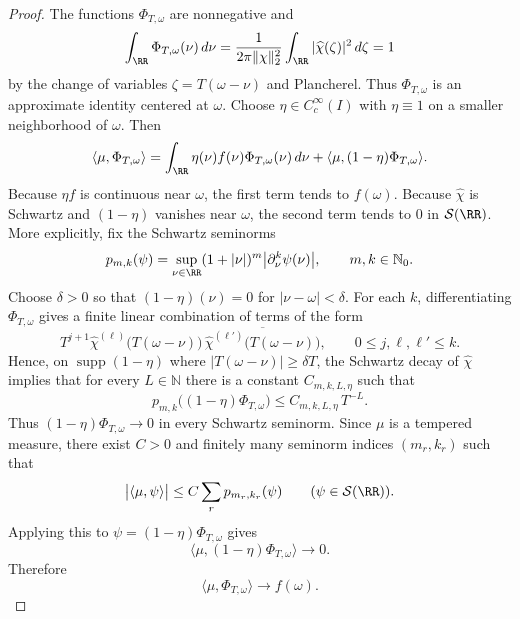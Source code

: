 \begin{proof}
The functions $\Phi_{T,\omega}$ are nonnegative and
\[
\int_{\RR}\Phi_{T,\omega}(\nu)\,d\nu
=\frac{1}{2\pi\|\chi\|_2^2}\int_{\RR}|\widehat\chi(\zeta)|^2\,d\zeta
=1
\]
by the change of variables $\zeta=T(\omega-\nu)$ and Plancherel. Thus
$\Phi_{T,\omega}$ is an approximate identity centered at $\omega$. Choose
$\eta\in C_c^\infty(I)$ with $\eta\equiv1$ on a smaller neighborhood of
$\omega$. Then
\[
\langle \mu,\Phi_{T,\omega}\rangle
=\int_{\RR}\eta(\nu)f(\nu)\Phi_{T,\omega}(\nu)\,d\nu
+\langle \mu,(1-\eta)\Phi_{T,\omega}\rangle.
\]
Because $\eta f$ is continuous near $\omega$, the first term tends to
$f(\omega)$. Because $\widehat\chi$ is Schwartz and $(1-\eta)$ vanishes near
$\omega$, the second term tends to $0$ in $\mathcal S(\RR)$. More explicitly,
fix the Schwartz seminorms
\[
p_{m,k}(\psi)=\sup_{\nu\in\RR}(1+|\nu|)^m\bigl|\partial_\nu^k\psi(\nu)\bigr|,
\qquad m,k\in\mathbb N_0.
\]
Choose $\delta>0$ so that $(1-\eta)(\nu)=0$ for $|\nu-\omega|<\delta$. For each
$k$, differentiating $\Phi_{T,\omega}$ gives a finite linear combination of
terms of the form
\[
T^{j+1}
\widehat\chi^{(\ell)}\!\bigl(T(\omega-\nu)\bigr)\,
\overline{\widehat\chi^{(\ell')}\!\bigl(T(\omega-\nu)\bigr)},
\qquad 0\le j,\ell,\ell'\le k.
\]
Hence, on $\operatorname{supp}(1-\eta)$ where $|T(\omega-\nu)|\ge \delta T$,
the Schwartz decay of $\widehat\chi$ implies that for every $L\in\mathbb N$
there is a constant $C_{m,k,L,\eta}$ such that
\[
p_{m,k}\bigl((1-\eta)\Phi_{T,\omega}\bigr)\le C_{m,k,L,\eta}\,T^{-L}.
\]
Thus $(1-\eta)\Phi_{T,\omega}\to0$ in every Schwartz seminorm. Since $\mu$ is a
tempered measure, there exist $C>0$ and finitely many seminorm indices
$(m_r,k_r)$ such that
\[
\bigl|\langle \mu,\psi\rangle\bigr|
\le C\sum_r p_{m_r,k_r}(\psi)
\qquad (\psi\in\mathcal S(\RR)).
\]
Applying this to $\psi=(1-\eta)\Phi_{T,\omega}$ gives
\[
\langle \mu,(1-\eta)\Phi_{T,\omega}\rangle\longrightarrow0.
\]
Therefore
\[
\langle \mu,\Phi_{T,\omega}\rangle\longrightarrow f(\omega).
\]
\end{proof}

